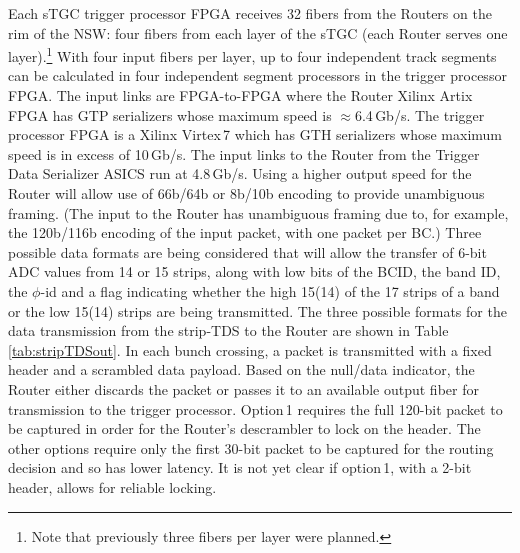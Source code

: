 Each sTGC trigger processor FPGA receives 32 fibers from the Routers on the rim of the NSW:
four fibers from each layer of the sTGC (each Router serves one layer).\footnote{Note that previously three fibers per layer were planned.}
With four input fibers per layer, up to four independent track segments can be calculated in four independent segment processors in the trigger processor FPGA.
The input links are FPGA-to-FPGA where the Router Xilinx Artix FPGA has GTP serializers whose maximum speed is $\approx$6.4\,Gb/s.
The trigger processor FPGA is a Xilinx Virtex\,7 which has GTH serializers whose maximum speed is in excess of 10\,Gb/s.
The input links to the Router from the Trigger Data Serializer ASICS run at 4.8\,Gb/s.
Using a higher output speed for the Router will allow use of 66b/64b or 8b/10b encoding to provide unambiguous framing.
(The input to the Router has unambiguous framing due to, for example, the 120b/116b encoding of the input packet, with one packet per BC.)
Three possible data formats are being considered that will allow the transfer of 6-bit ADC values from 14 or 15 strips, along with low bits of the BCID, the band ID, the $\phi$-id
and a flag indicating whether the high 15(14) of the 17 strips of a band or the low 15(14) strips are being transmitted.
The three possible formats for the data transmission from the strip-TDS to the Router are shown in Table\,\ref{tab:stripTDSout}.
In each bunch crossing, a packet is transmitted with a fixed header and a scrambled data payload.
Based on the null/data indicator, the Router either discards the packet or passes it to an available output fiber for transmission to the trigger processor.
Option\,1 requires the full 120-bit packet to be captured in order for the Router's descrambler to lock on the header.
The other options require only the first 30-bit packet to be captured for the routing decision and so has lower latency.
It is not yet clear if option\,1, with a 2-bit header, allows for reliable locking.


